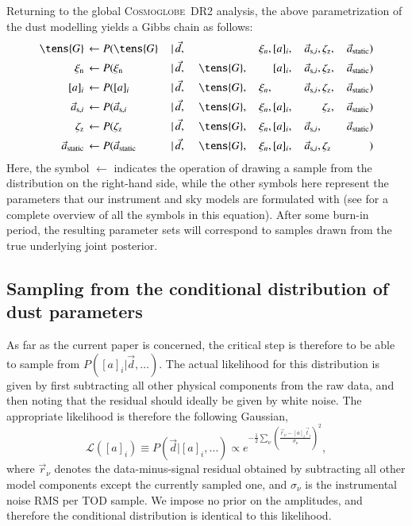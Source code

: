 \documentclass{aa}
\newcommand{\dv}[0]{\vec{d}}
\renewcommand{\r}[0]{\vec{r}}
\newcommand{\G}[0]{\tens{G}}
\renewcommand{\a}[0]{\vec{a}}
\renewcommand{\t}[0]{\vec{t}}
\def\Cosmoglobe{\textsc{Cosmoglobe}}
\begin{document}
{Returning to the global \Cosmoglobe\ DR2 analysis, the above parametrization of
the dust modelling yields a Gibbs chain as follows:
\begin{equation}
\label{eq:gibbschain}
\begin{aligned}
\G &\,\leftarrow P(\G&\,\mid &\,\dv,&\, &\,\phantom{\G} &\,\xi_n, &
\,[a]_i,& \,\a_{\mathrm{s},i}, &\,\zeta_{\mathrm{z}},
&\,\a_{\mathrm{static}})\\
\xi_{\mathrm{n}} &\,\leftarrow P(\xi_{\mathrm{n}}&\,\mid &\,\dv,&\, &\,\G, &\,\phantom{\xi_n} &
\,[a]_i,& \,\a_{\mathrm{s},i}, &\,\zeta_{\mathrm{z}},
&\,\a_{\mathrm{static}})\\
[a]_i &\,\leftarrow P([a]_i&\,\mid &\,\dv,&\, &\,\G, &\,\xi_n, &
\,\phantom{[a]_i}& \,\a_{\mathrm{s},i}, &\,\zeta_{\mathrm{z}}, &\,\a_{\mathrm{static}})\\
\a_{\mathrm{s},i} &\,\leftarrow P(\a_{\mathrm{s},i}&\,\mid &\,\dv,&\, &\,\G, &\,\xi_n, &
\,[a]_i,& \,\phantom{\a_{\mathrm{s},i},}
&\,\zeta_{\mathrm{z}}, &\,\a_{\mathrm{static}})\\
\zeta_{\mathrm{z}} &\,\leftarrow P(\zeta_{\mathrm{z}}&\,\mid &\,\dv,&\, &\,\G, &\,\xi_n, &
\,[a]_i,& \,\a_{\mathrm{s},i},
&\,\phantom{\zeta_{\mathrm{z}},} &\,\a_{\mathrm{static}})\\
\a_{\mathrm{static}} &\,\leftarrow P(\a_{\mathrm{static}}&\,\mid &\,\dv,&\, &\,\G, &\,\xi_n, &
\,[a]_i,& \,\a_{\mathrm{s},i}, &\,\zeta_{\mathrm{z}} &\,\phantom{\a_{\mathrm{static}}})
\end{aligned}
\end{equation}
Here, the symbol $\leftarrow$ indicates the operation of drawing a sample from
the distribution on the right-hand side, while the other symbols here represent
the parameters that our instrument and sky models are formulated with (see
\citet{CG02_01} for a complete overview of all the symbols in this equation).
After some burn-in period, the resulting parameter sets will correspond to
samples drawn from the true underlying joint posterior.

\subsection{Sampling from the conditional distribution of dust parameters}
As far as the current paper is concerned, the critical step is
therefore to be able to sample from $P([a]_i | \dv, \ldots)$. The actual
likelihood for this distribution is given by first subtracting all other
physical components from the raw data, and then noting that the
residual should ideally be given by white noise. The appropriate
likelihood is therefore the following Gaussian,
\begin{equation}
\mathcal{L}([a]_i) \equiv P(\dv|[a]_i, \ldots) \propto e^{-\frac{1}{2} \sum_{\nu}\left(\frac{\r_\nu -
    [a]_i \t_i}{\sigma_\nu}\right)^2},
\label{eq:likelihood}
\end{equation}
where $\r_{\nu}$ denotes the data-minus-signal residual obtained by
subtracting all other model components except the currently sampled
one, and $\sigma_\nu$ is the instrumental noise RMS per TOD sample. We
impose no prior on the amplitudes, and therefore the conditional
distribution is identical to this likelihood.

}
\end{document}
